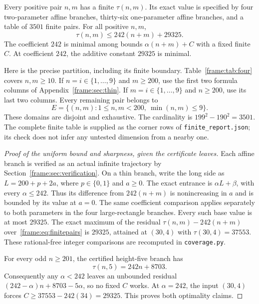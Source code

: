 \begin{theorem}\label{frame:thm:solid}
Every positive pair $n,m$ has a finite $\tau(n,m)$. Its exact value is specified by four two-parameter affine branches, thirty-six one-parameter affine branches, and a table of $3501$ finite pairs. For all positive $n,m$,
\begin{equation}\label{frame:eq:uniform}
 \tau(n,m)\le242(n+m)+29325.
\end{equation}
The coefficient $242$ is minimal among bounds $\alpha(n+m)+C$ with a fixed finite $C$. At coefficient $242$, the additive constant $29325$ is minimal.
\end{theorem}

Here is the precise partition, including its finite boundary. Table~\ref{frame:tab:four} covers $n,m\ge10$. If $n=i\in\{1,\ldots,9\}$ and $m\ge200$, use the first two formula columns of Appendix~\ref{frame:sec:thin}. If $m=i\in\{1,\ldots,9\}$ and $n\ge200$, use its last two columns. Every remaining pair belongs to
\begin{equation}\label{frame:eq:finitepairs}
 E=\{(n,m):1\le n,m<200,\ \min(n,m)\le9\}.
\end{equation}
These domains are disjoint and exhaustive. The cardinality is $199^2-190^2=3501$. The complete finite table is supplied as the corner rows of \texttt{finite\_report.json}; its check does not infer any untested dimension from a nearby one.

\begin{proof}[Proof of the uniform bound and sharpness, given the certificate leaves]
Each affine branch is verified as an actual infinite trajectory by Section~\ref{frame:sec:verification}. On a thin branch, write the long side as $L=200+p+2a$, where $p\in\{0,1\}$ and $a\ge0$. The exact entrance is $\alpha L+\beta$, with every $\alpha\le242$. Thus its difference from $242(n+m)$ is nonincreasing in $a$ and is bounded by its value at $a=0$. The same coefficient comparison applies separately to both parameters in the four large-rectangle branches. Every such base value is at most $29325$. The exact maximum of the residual $\tau(n,m)-242(n+m)$ over~\eqref{frame:eq:finitepairs} is $29325$, attained at $(30,4)$ with $\tau(30,4)=37553$. These rational-free integer comparisons are recomputed in \texttt{coverage.py}.

For every odd $n\ge201$, the certified height-five branch has
\[
 \tau(n,5)=242n+8703.
\]
Consequently any $\alpha<242$ leaves an unbounded residual $(242-\alpha)n+8703-5\alpha$, so no fixed $C$ works. At $\alpha=242$, the input $(30,4)$ forces $C\ge37553-242(34)=29325$. This proves both optimality claims.
\end{proof}

